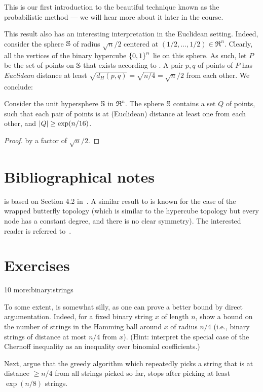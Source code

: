 This is our first introduction to the beautiful technique known as the
probabilistic method --- we will hear more about it later in the
course.


This result also has an interesting interpretation in the Euclidean
setting. Indeed, consider the sphere $\mathbb{S}$ of radius
$\sqrt{n}/2$ centered at $(1/2, \dots, 1/2) \in \Re^n$. Clearly,
all the vertices of the binary hypercube $\left\{ {0,1} \right\}^n$ lie on this
sphere. As such, let $P$ be the set of points on $\mathbb{S}$ that
exists according to . A pair $p,q$ of points of $P$
has \emph{Euclidean} distance at least
$\sqrt{d_H(p,q)} = \sqrt{n/4} = \sqrt{n}/2$ from each other. We
conclude:

\begin{lemma}
    Consider the unit hypersphere $\mathbb{S}$ in $\Re^n$. The sphere
    $\mathbb{S}$ contains a set $Q$ of points, such that each pair of
    points is at (Euclidean) distance at least one from each other,
    and $\left| {Q} \right| \geq \exp(n/16)$.
\end{lemma}
\begin{proof}
     by a factor of
    $\sqrt{n}/2$.
\end{proof}

\section{Bibliographical notes}


 is based on Section 4.2 in~\cite{mr-ra-95}.  A
similar result to  is known for the case of the wrapped
butterfly topology (which is similar to the hypercube topology but
every node has a constant degree, and there is no clear symmetry). The
interested reader is referred to~\cite{mu-pcrap-05}.

\section{Exercises}

%
{10}%
{more:binary:strings}%
{%
   To some extent,  is somewhat silly, as one can
   prove a better bound by direct argumentation. Indeed, for a fixed
   binary string $x$ of length $n$, show a bound on the number of
   strings in the Hamming ball around $x$ of radius $n/4$ (i.e.,
   binary strings of distance at most $n/4$ from $x$). (Hint:
   interpret the special case of the Chernoff inequality as an
   inequality over binomial coefficients.)

   Next, argue that the greedy algorithm which repeatedly picks a
   string that is at distance $\geq n/4$ from all strings picked so
   far, stops after picking at least $\exp(n/8)$ strings. %
}{}


